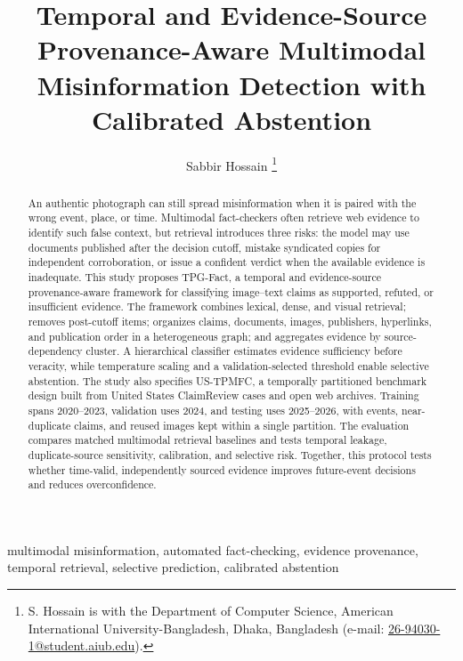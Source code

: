 \documentclass[journal]{IEEEtran}
\title{Temporal and Evidence-Source Provenance-Aware Multimodal Misinformation Detection with Calibrated Abstention}
\author{Sabbir Hossain%
\thanks{S. Hossain is with the Department of Computer Science, American International University-Bangladesh, Dhaka, Bangladesh (e-mail: \href{mailto:26-94030-1@student.aiub.edu}{26-94030-1@student.aiub.edu}).}}
\newcommand{\systemname}{TPG-Fact}
\newcommand{\datasetname}{US-TPMFC}
\begin{document}
\maketitle

\begin{abstract}
An authentic photograph can still spread misinformation when it is paired with the wrong event, place, or time. Multimodal fact-checkers often retrieve web evidence to identify such false context, but retrieval introduces three risks: the model may use documents published after the decision cutoff, mistake syndicated copies for independent corroboration, or issue a confident verdict when the available evidence is inadequate. This study proposes \systemname{}, a temporal and evidence-source provenance-aware framework for classifying image--text claims as supported, refuted, or insufficient evidence. The framework combines lexical, dense, and visual retrieval; removes post-cutoff items; organizes claims, documents, images, publishers, hyperlinks, and publication order in a heterogeneous graph; and aggregates evidence by source-dependency cluster. A hierarchical classifier estimates evidence sufficiency before veracity, while temperature scaling and a validation-selected threshold enable selective abstention. The study also specifies \datasetname{}, a temporally partitioned benchmark design built from United States ClaimReview cases and open web archives. Training spans 2020--2023, validation uses 2024, and testing uses 2025--2026, with events, near-duplicate claims, and reused images kept within a single partition. The evaluation compares matched multimodal retrieval baselines and tests temporal leakage, duplicate-source sensitivity, calibration, and selective risk. Together, this protocol tests whether time-valid, independently sourced evidence improves future-event decisions and reduces overconfidence.
\end{abstract}

\begin{IEEEkeywords}
multimodal misinformation, automated fact-checking, evidence provenance, temporal retrieval, selective prediction, calibrated abstention
\end{IEEEkeywords}












\end{document}
